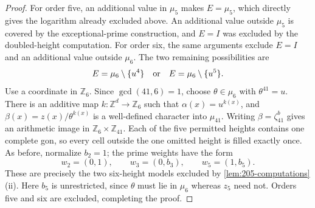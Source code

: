 \documentclass[10pt,a4paper]{amsart}
\newcommand{\Z}{\mathbb Z}
\begin{document}
\begin{proof}
For order five, an additional value in $\mu_5$ makes $E=\mu_5$,
which directly gives the logarithm already excluded above. An additional
value outside $\mu_5$ is covered by the exceptional-prime construction,
and $E=I$ was excluded by the doubled-height computation.
For order six, the same arguments exclude $E=I$ and an additional
value outside $\mu_6$. The two remaining possibilities are
\[
 E=\mu_6\setminus\{u^4\}
 \quad\hbox{or}\quad E=\mu_6\setminus\{u^5\}.
\]
Use a coordinate in $\Z_6$. Since $\gcd(41,6)=1$, choose
$\theta\in\mu_6$ with
$\theta^{41}=u$. There is an additive map
$k:\Z^d\to\Z_6$ such that $\alpha(x)=u^{k(x)}$, and
$\beta(x)=z(x)/\theta^{k(x)}$ is a well-defined character into
$\mu_{41}$. Writing $\beta=\zeta_{41}^b$ gives an arithmetic image
in $\Z_6\times\Z_{41}$. Each of the five permitted heights contains
one complete gon, so every cell outside the one omitted height is
filled exactly once. As before, normalize $b_2=1$; the prime weights
have the form
\[
 w_2=(0,1),\qquad w_3=(0,b_3),\qquad w_5=(1,b_5).
\]
These are precisely the two six-height models excluded by
\cref{lem:205-computations}(ii). Here $b_5$ is unrestricted, since
$\theta$ must lie in $\mu_6$ whereas $z_5$ need not.
Orders five and six are excluded, completing the proof.
\end{proof}
\end{document}
